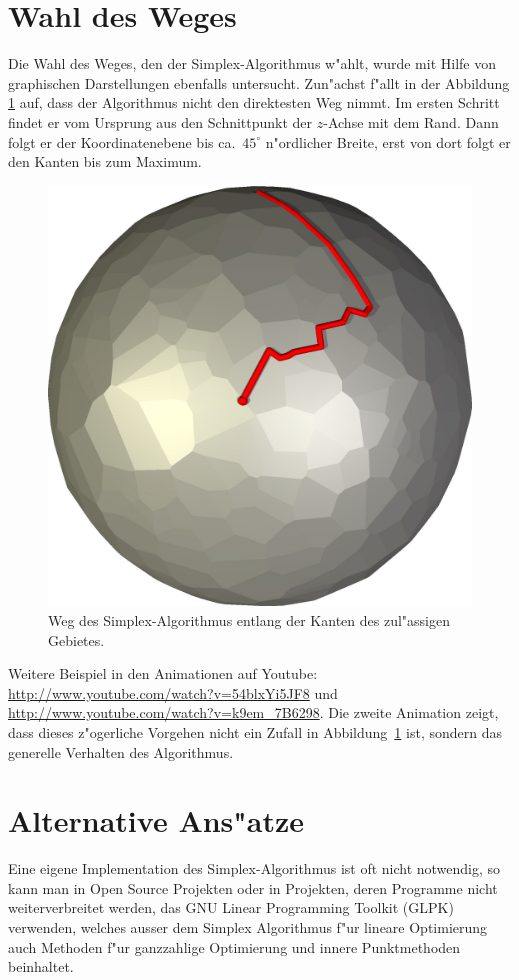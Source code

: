 \section{Wahl des Weges}
Die Wahl des Weges, den der Simplex-Algorithmus w"ahlt, wurde
mit Hilfe von graphischen Darstellungen ebenfalls untersucht.
Zun"achst f"allt in der Abbildung \ref{simplex:kanten} auf,
dass der Algorithmus nicht den direktesten Weg nimmt. Im ersten
Schritt findet er vom Ursprung aus den Schnittpunkt der $z$-Achse mit
dem Rand. Dann folgt er der Koordinatenebene bis ca.~$45^\circ$
n"ordlicher Breite, erst von dort folgt er den Kanten bis zum Maximum.
\begin{figure}
\begin{center}
\includegraphics[width=0.7\hsize]{add/sphere.jpg}
\end{center}
\caption{Weg des Simplex-Algorithmus entlang der Kanten 
des zul"assigen Gebietes.
\label{simplex:kanten}}
\end{figure}
Weitere Beispiel in den Animationen auf Youtube:
\url{http://www.youtube.com/watch?v=54blxYi5JF8}
und
\url{http://www.youtube.com/watch?v=k9em_7B6298}.
Die zweite Animation zeigt, dass dieses z"ogerliche Vorgehen nicht
ein Zufall in Abbildung~\ref{simplex:kanten} ist, sondern das
generelle Verhalten des Algorithmus.
\section{Alternative Ans"atze}
Eine eigene Implementation des Simplex-Algorithmus ist oft nicht
notwendig, so kann man in Open Source Projekten oder in Projekten,
deren Programme nicht weiterverbreitet werden, das GNU Linear
Programming Toolkit (GLPK) verwenden, welches ausser dem
Simplex Algorithmus f"ur lineare Optimierung auch Methoden f"ur
ganzzahlige Optimierung und innere Punktmethoden beinhaltet.
